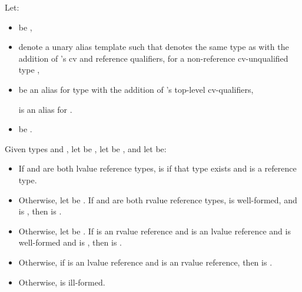 %
\pnum
Let:
\begin{itemize}
\item {} be
  ,
\item {} denote a unary alias template 
  such that  denotes the same type as  with the addition
  of 's cv and reference qualifiers, for a non-reference cv-unqualified
  type ,
\item {} be an alias for type 
  with the addition of 's top-level cv-qualifiers,
  \begin{example}
     is an alias for
    .
  \end{example}
\item {} be
  .
\end{itemize}
Given types  and ,
let  be ,
let  be , and
let  be:
\begin{itemize}
\item If  and  are both lvalue reference types,
   is
   if that type exists
  and is a reference type.
\item Otherwise, let  be
  .
  If  and  are both rvalue reference types,
   is well-formed, and
   is ,
  then  is .
\item Otherwise, let  be
  . If  is an rvalue
  reference and  is an lvalue reference and  is
  well-formed and  is
  , then  is .
\item Otherwise, if  is an lvalue reference and 
  is an rvalue reference, then  is
  .
\item Otherwise,  is ill-formed.
\end{itemize}

